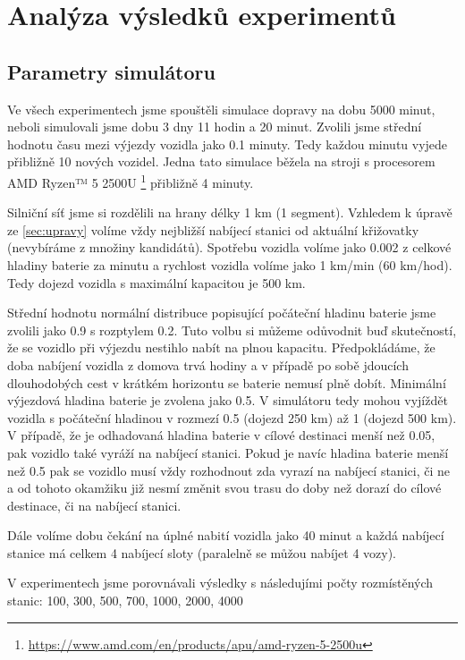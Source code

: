 \chapter{Analýza výsledků experimentů}

\section{Parametry simulátoru}
\label{sec:par_sim}
Ve všech experimentech jsme spouštěli simulace dopravy na dobu 5000 minut,
neboli simulovali jsme dobu 3 dny 11 hodin a 20 minut. Zvolili jsme střední hodnotu
času mezi výjezdy vozidla jako 0.1 minuty. Tedy každou minutu vyjede přibližně 10 nových 
vozidel. Jedna tato simulace běžela na stroji s procesorem AMD Ryzen™ 5 2500U 
\footnote{\url{https://www.amd.com/en/products/apu/amd-ryzen-5-2500u}} 
přibližně 4 minuty.

Silniční síť jsme si rozdělili na hrany délky 1 km (1 segment). Vzhledem
k úpravě ze \cref{sec:upravy} volíme vždy nejbližší nabíjecí stanici od aktuální
křižovatky (nevybíráme z množiny kandidátů). Spotřebu vozidla volíme jako 0.002
z celkové hladiny baterie za minutu a rychlost vozidla volíme jako 1 km/min (60 km/hod).
Tedy dojezd vozidla s maximální kapacitou je 500 km. 

Střední hodnotu normální distribuce popisující počáteční
hladinu baterie jsme zvolili jako 0.9 s rozptylem 0.2. Tuto volbu si můžeme odůvodnit
buď skutečností, že se vozidlo při výjezdu nestihlo nabít na plnou kapacitu. 
Předpokládáme, že doba nabíjení vozidla z domova trvá hodiny a v případě po sobě
jdoucích dlouhodobých cest v krátkém horizontu se baterie nemusí plně dobít.
Minimální výjezdová hladina baterie je zvolena jako 0.5. V simulátoru tedy mohou 
vyjíždět vozidla s počáteční hladinou v rozmezí 0.5 (dojezd 250 km) až 1 (dojezd 500 km).
V případě, že je odhadovaná hladina baterie v cílové destinaci menší než 0.05, pak
vozidlo také vyráží na nabíjecí stanici. Pokud je navíc hladina baterie menší než 0.5 
pak se vozidlo musí vždy rozhodnout zda vyrazí na nabíjecí stanici, či ne a od tohoto
okamžiku již nesmí změnit svou trasu do doby než dorazí do cílové destinace, či na 
nabíjecí stanici.

Dále volíme dobu čekání na úplné nabití vozidla jako 40 minut a každá nabíjecí
stanice má celkem 4 nabíjecí sloty (paralelně se můžou nabíjet 4 vozy).

V experimentech jsme porovnávali výsledky s následujími počty rozmístěných stanic:
100, 300, 500, 700, 1000, 2000, 4000

